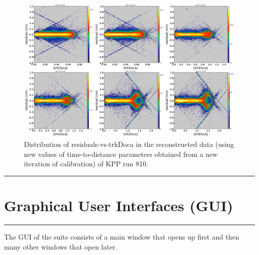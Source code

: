 \documentclass[12pt]{article}
\begin{document}
\begin{figure}[H]
    \centering
    \includegraphics[width=1.0\textwidth]{Figures/residual_vs_doca_Iter2NwDef3T0nw5n.png}
    \caption{Distribution of residuals-vs-trkDoca in the reconstructed data (using new values of time-to-distance parameters obtained from a new iteration of calibration) of KPP run 810.}
    \label{fResidualsVsDocaDefAllSLiter1}
\end{figure}




{\color{black} \rule{\linewidth}{0.75mm} }
\section{Graphical User Interfaces (GUI)}
{\color{black} \rule{\linewidth}{0.75mm} }

The GUI of the suite consists of a main window that opens up first and then many other windows that open later. 
\end{document}
